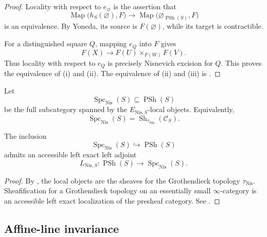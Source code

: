\begin{proof}
Locality with respect to \(e_{\varnothing}\) is the assertion that
\[
    \operatorname{Map}
    \bigl(
        h_S(\varnothing),
        F
    \bigr)
    \longrightarrow
    \operatorname{Map}
    \bigl(
        \varnothing_{\operatorname{PSh}(S)},
        F
    \bigr)
\]
is an equivalence.  By Yoneda, its source is \(F(\varnothing)\), while
its target is contractible.

For a distinguished square \(Q\), mapping \(e_Q\) into \(F\) gives
\[
    F(X)
    \longrightarrow
    F(U)
    \times_{F(W)}
    F(V).
\]
Thus locality with respect to \(e_Q\) is precisely Nisnevich excision
for \(Q\).  This proves the equivalence of (i) and (ii).  The equivalence
of (ii) and (iii) is
.
\end{proof}

\begin{definition}
\label{def:nisnevich-local-spectral-spaces}
Let
\[
    \operatorname{Spc}_{\mathrm{Nis}}(S)
    \subseteq
    \operatorname{PSh}(S)
\]
be the full subcategory spanned by the
\(E_{\mathrm{Nis},S}\)-local objects.  Equivalently,
\[
    \operatorname{Spc}_{\mathrm{Nis}}(S)
    =
    \operatorname{Sh}_{\tau_{\mathrm{Nis}}}(\mathcal C_S).
\]
\end{definition}

\begin{proposition}
\label{prop:nisnevich-localization-exists}
The inclusion
\[
    \operatorname{Spc}_{\mathrm{Nis}}(S)
    \hookrightarrow
    \operatorname{PSh}(S)
\]
admits an accessible left exact left adjoint
\[
    L_{\mathrm{Nis},S}
    \colon
    \operatorname{PSh}(S)
    \longrightarrow
    \operatorname{Spc}_{\mathrm{Nis}}(S).
\]
\end{proposition}

\begin{proof}
By , the local objects are the sheaves
for the Grothendieck topology \(\tau_{\mathrm{Nis}}\).  Sheafification
for a Grothendieck topology on an essentially small \(\infty\)-category
is an accessible left exact localization of the presheaf category.  See
\cite{LurieHTT}.
\end{proof}

\subsection{Affine-line invariance}

